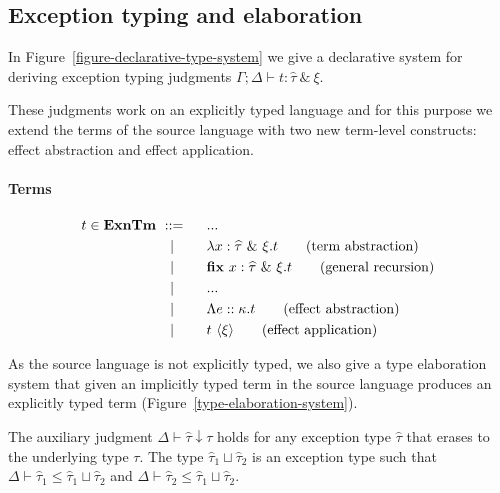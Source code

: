 \documentclass{llncs}
\renewcommand{\leq}{\leqslant}
\newcommand{\ClassExnTm}{\mathbf{ExnTm}}
\newcommand{\ExnTy}{\widehat\tau}
\newcommand{\Exn}{\xi}
\newcommand{\ExnVar}{e}
\newcommand{\Kind}{\kappa}                          %
\newcommand{\Tm}{t}
\newcommand{\TmVar}{x}
\newcommand{\TmAbs}[3]{\lambda #1 : #2. #3}
\newcommand{\TmAnnAbs}[3]{\Lambda #1 :: #2. #3}
\newcommand{\TmAnnApp}[2]{#1\ \langle #2 \rangle}
\newcommand{\TmFixExn}[4]{\mathbf{fix}\ #1 : #2\ \&\ #3. #4}
\newcommand{\Ty}{\tau}
\newcommand{\TyEnv}{\Gamma}
\newcommand{\KiEnv}{\Delta}
\newcommand{\JudgeExnTy}[5]{{#1; #2 \vdash #3 : #4\ \&\ #5}}
\newcommand{\JudgeSubTy}[3]{{#1 \vdash #2 \leq #3}}
\newcommand{\JudgeTyElab}[3]{{#1 \vdash #2 \downarrow #3}}
\begin{document}
\subsection{Exception typing and elaboration}

In Figure~\ref{figure-declarative-type-system} we give a declarative system for deriving exception typing judgments $\JudgeExnTy{\TyEnv}{\KiEnv}{\Tm}{\ExnTy}{\Exn}$.

These judgments work on an explicitly typed language and for this purpose we extend the terms of the source language with two new term-level constructs: effect abstraction and effect application.

\paragraph{Terms}
\begin{alignat}{2}
\!  \Tm \in \ClassExnTm &\ ::=\   &&\ ...                            \notag       \\
                        &\quad|  &&\ \TmAbs{\TmVar}{\ExnTy\ \&\ \Exn}{\Tm} \tag{term abstraction} \\
                        &\quad|  &&\ \TmFixExn{\TmVar}{\ExnTy}{\Exn}{\Tm} \tag{general recursion} \\
                        &\quad|  &&\ ...                            \notag       \\
                        &\quad|  &&\ \TmAnnAbs{\ExnVar}{\Kind}{\Tm} \tag{effect abstraction}  \\
                        &\quad|  &&\ \TmAnnApp{\Tm}{\Exn}           \tag{effect application}
\end{alignat}

As the source language is not explicitly typed, we also give a type elaboration system that given an implicitly typed term in the source language produces an explicitly typed term (Figure~\ref{type-elaboration-system}).

The auxiliary judgment $\JudgeTyElab{\KiEnv}{\ExnTy}{\Ty}$ holds for any exception type $\ExnTy$ that erases to the underlying type $\Ty$. The type $\ExnTy_1 \sqcup \ExnTy_2$ is an exception type such that $\JudgeSubTy{\KiEnv}{\ExnTy_1}{\ExnTy_1 \sqcup \ExnTy_2}$ and $\JudgeSubTy{\KiEnv}{\ExnTy_2}{\ExnTy_1 \sqcup \ExnTy_2}$.
\end{document}
